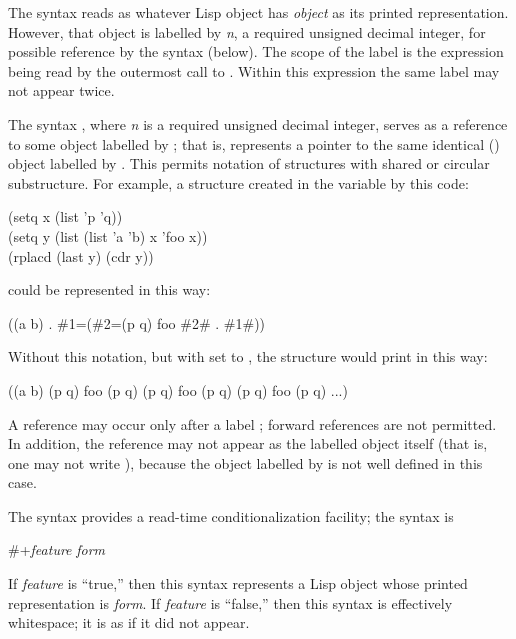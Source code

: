 \begin{flushdesc}
\item[\cd{\#\emph{n}{\Xequal}}]
The syntax  reads as whatever Lisp object
has \emph{object} as its printed representation.  However, that object
is labelled by \emph{n}, a required unsigned decimal integer, for
possible reference by the syntax  (below).
The scope of the label is the expression being read by the outermost
call to .  Within this expression
the same label may not appear twice.

\item[\cd{\#\emph{n}\#}]
The syntax , where \emph{n} is a required unsigned decimal integer,
serves as a reference to some object labelled by ;
that is,  represents a pointer to the same identical
() object labelled by .
This permits notation of structures with shared or circular substructure.
For example, a structure created in the variable  by this code:
\begin{lisp}
(setq x (list 'p 'q)) \\
(setq y (list (list 'a 'b) x 'foo x)) \\
(rplacd (last y) (cdr y))
\end{lisp}
could be represented in this way:
\begin{lisp}
((a b) . \#1=(\#2=(p q) foo \#2\# . \#1\#))
\end{lisp}
Without this notation, but with  set to ,
the structure would print in this way:
\begin{lisp}
((a b) (p q) foo (p q) (p q) foo (p q) (p q) foo (p q) ...)
\end{lisp}
A reference  may occur only after a label ;
forward references are not permitted.  In addition, the reference
may not appear as the labelled object itself (that is,
one may not write ), because the object
labelled by  is not well defined in this case.

\item[\cd{\#+}]
\label{READ-TIME-CONDITIONAL}
The \cd{\#+} syntax provides a read-time conditionalization facility;
the syntax is
\begin{lisp}
\#+\emph{feature} \emph{form}
\end{lisp}
If \emph{feature} is ``true,'' then this syntax represents a Lisp object
whose printed representation is \emph{form}.  If \emph{feature} is ``false,''
then this syntax is effectively whitespace; it is as if it did not appear.


\end{flushdesc}
